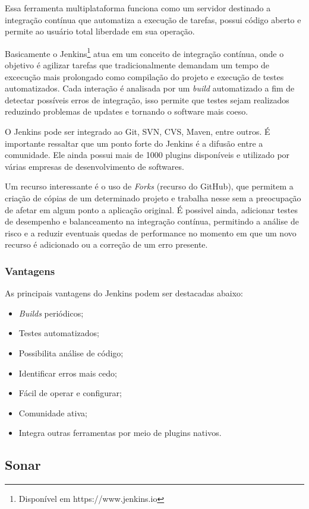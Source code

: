 Essa ferramenta multiplataforma funciona como um servidor destinado a integração contínua que automatiza a execução de tarefas, possui código aberto e permite ao usuário total liberdade em sua operação.

Basicamente o Jenkins\footnote{Disponível em https://www.jenkins.io} atua em um conceito de integração contínua, onde o objetivo é agilizar tarefas que tradicionalmente demandam um tempo de excecução mais prolongado como compilação do projeto e execução de testes automatizados. Cada interação é analisada por um \textit{build} automatizado a fim de detectar possíveis erros de integração, isso permite que testes sejam realizados reduzindo problemas de updates e tornando o software mais coeso.\cite{atalay}

O Jenkins pode ser integrado ao Git, SVN, CVS, Maven, entre outros. É importante ressaltar que um ponto forte do Jenkins é a difusão entre a comunidade. Ele ainda possui mais de 1000 plugins disponíveis e utilizado por várias empresas de desenvolvimento de softwares.\cite{ouverney2018automaccao}

Um recurso interessante é o uso de \textit{Forks} (recurso do GitHub), que permitem a criação de cópias de um determinado projeto e trabalha nesse sem a preocupação de afetar em algum ponto a aplicação original. É possivel ainda, adicionar testes de desempenho e balanceamento na integração contínua, permitindo a análise de risco e a reduzir eventuais quedas de performance no momento em que um novo recurso é adicionado ou a correção de um erro presente.\cite{ouverney2018automaccao}

\subsubsection{Vantagens}
As principais vantagens do Jenkins podem ser destacadas abaixo:
\begin{itemize}
\item \textit{Builds} periódicos;
\item Testes automatizados;
\item Possibilita análise de código;
\item Identificar erros mais cedo;
\item Fácil de operar e configurar;
\item Comunidade ativa;
\item Integra outras ferramentas por meio de plugins nativos.
\end{itemize}

\subsection{Sonar}


